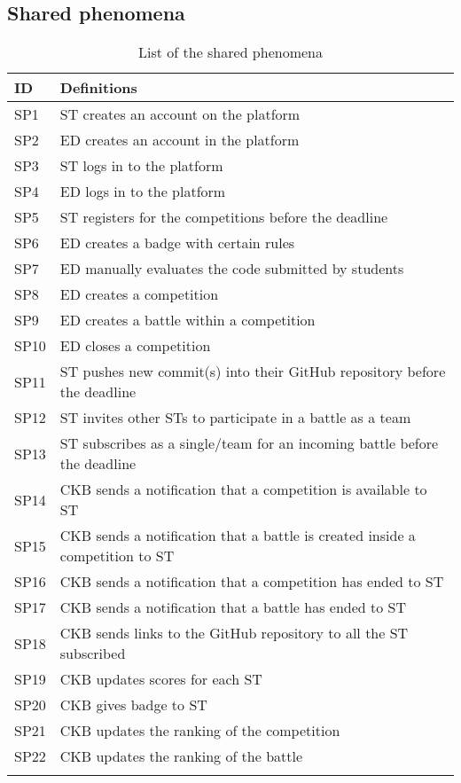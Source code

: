 \subsection{Shared phenomena}
\label{ss:shared_phenomena}%

\begin{longtable}{|l|l|}

  \hline
  \textbf{ID} & \textbf{Definitions}      \\
  \hline
  SP1 & ST creates an account on the platform \\
  \hline
  SP2 & ED creates an account in the platform \\
  \hline
  SP3 & ST logs in to the platform \\
  \hline
  SP4 & ED logs in to the platform  \\
  \hline
  SP5 & ST registers for the competitions before the deadline   \\
  \hline
  SP6 & ED creates a badge with certain rules   \\
  \hline
  SP7 & ED manually evaluates the code submitted by students   \\
  \hline
  SP8 & ED creates a competition   \\
  \hline
  SP9 & ED creates a battle within a competition   \\
  \hline
  SP10 & ED closes a competition   \\
  \hline
  SP11 & ST pushes new commit(s) into their GitHub repository before the deadline   \\
  \hline
  SP12 & ST invites other STs to participate in a battle as a team   \\
  \hline
  SP13 & ST subscribes as a single/team for an incoming battle before the deadline   \\
  \hline
  SP14 & CKB sends a notification that a competition is available to ST   \\
  \hline
  SP15 & CKB sends a notification that a battle is created inside a competition to ST   \\
  \hline
  SP16 & CKB sends a notification that a competition has ended to ST   \\
  \hline
  SP17 & CKB sends a notification that a battle has ended to ST   \\
  \hline
  SP18 & CKB sends links to the GitHub repository to all the ST subscribed   \\
  \hline
  SP19 & CKB updates scores for each ST   \\
  \hline
  SP20 & CKB gives badge to ST   \\
  \hline
  SP21 & CKB updates the ranking of the competition   \\
  \hline
  SP22 & CKB updates the ranking of the battle   \\
  \hline
  
  \caption{List of the shared phenomena}
  \label{tab:sharedPhenomena}
\end{longtable}


